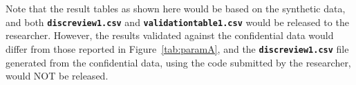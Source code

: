 \documentclass{article}
\newcommand*{\Code}[1]{\texttt{\textbf{#1}}}
\begin{document}
Note that the result tables as shown here would be based on the synthetic data, and both \Code{discreview1.csv} and \Code{validationtable1.csv} would be released to the researcher. However, the results validated against the confidential data would differ from those reported in Figure~\ref{tab:paramA}, and the  \Code{discreview1.csv} file generated from the confidential data, using the code submitted by the researcher, would NOT be released.





\newpage

\appendix

\end{document}
